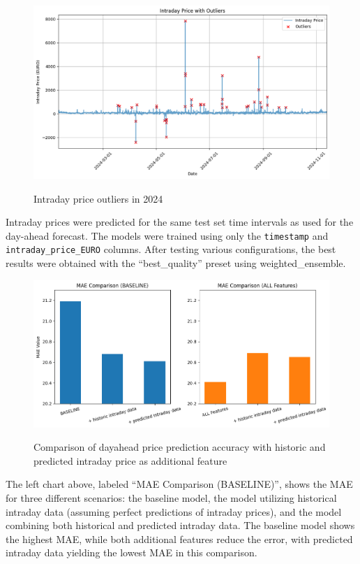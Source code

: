 \documentclass[a4paper]{article}
\begin{document}
\begin{figure}
\centering
{\includegraphics[keepaspectratio]{src/Intraday_price_outliers_2024_plot.png}}
\caption{Intraday price outliers in 2024}
\end{figure}

    Intraday prices were predicted for the same test set time intervals as
used for the day-ahead forecast. The models were trained using only the
\texttt{timestamp} and \texttt{intraday\_price\_EURO} columns. After
testing various configurations, the best results were obtained with the
``best\_quality'' preset using weighted\_ensemble.

\begin{figure}
\centering
{\includegraphics[keepaspectratio]{src/Intraday_price_comparison_plots.png}}
\caption{Comparison of dayahead price prediction accuracy with historic
and predicted intraday price as additional feature}
\end{figure}

The left chart above, labeled ``MAE Comparison (BASELINE)'', shows the
MAE for three different scenarios: the baseline model, the model
utilizing historical intraday data (assuming perfect predictions of
intraday prices), and the model combining both historical and predicted
intraday data. The baseline model shows the highest MAE, while both
additional features reduce the error, with predicted intraday data
yielding the lowest MAE in this comparison.
\end{document}
